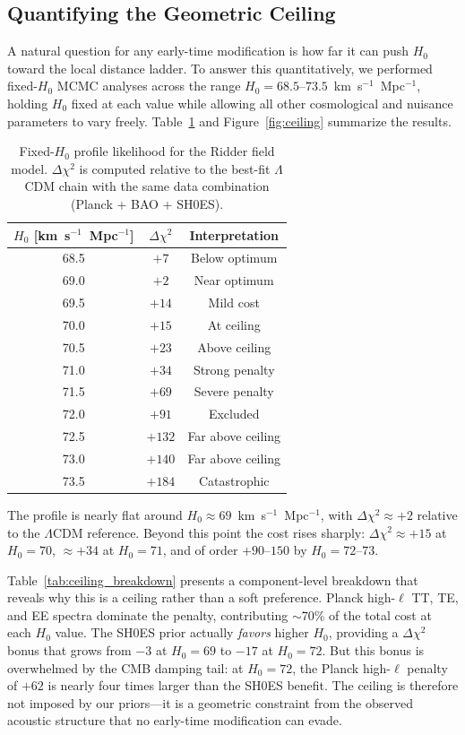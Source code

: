 \documentclass[a4paper,11pt]{article}
\begin{document}
\subsection{Quantifying the Geometric Ceiling}
\label{sec:ceiling_quantitative}

A natural question for any early-time modification is how far it can push $H_0$ toward the local distance ladder. To answer this quantitatively, we performed fixed-$H_0$ MCMC analyses across the range $H_0 = 68.5$--$73.5$~km~s$^{-1}$~Mpc$^{-1}$, holding $H_0$ fixed at each value while allowing all other cosmological and nuisance parameters to vary freely. Table~\ref{tab:h0_ceiling} and Figure~\ref{fig:ceiling} summarize the results.

\begin{table}[ht]
\centering
\caption{Fixed-$H_0$ profile likelihood for the Ridder field model. $\Delta\chi^2$ is computed relative to the best-fit $\Lambda$CDM chain with the same data combination (Planck + BAO + SH0ES).}
\label{tab:h0_ceiling}
\begin{tabular}{ccc}
\toprule
$H_0$ [km~s$^{-1}$~Mpc$^{-1}$] & $\Delta\chi^2$ & Interpretation \\
\midrule
68.5 & $+7$ & Below optimum \\
69.0 & $+2$ & Near optimum \\
69.5 & $+14$ & Mild cost \\
70.0 & $+15$ & At ceiling \\
70.5 & $+23$ & Above ceiling \\
71.0 & $+34$ & Strong penalty \\
71.5 & $+69$ & Severe penalty \\
72.0 & $+91$ & Excluded \\
72.5 & $+132$ & Far above ceiling \\
73.0 & $+140$ & Far above ceiling \\
73.5 & $+184$ & Catastrophic \\
\bottomrule
\end{tabular}
\end{table}

The profile is nearly flat around $H_0 \approx 69$~km~s$^{-1}$~Mpc$^{-1}$, with $\Delta\chi^2 \approx +2$ relative to the $\Lambda$CDM reference. Beyond this point the cost rises sharply: $\Delta\chi^2 \approx +15$ at $H_0 = 70$, $\approx +34$ at $H_0 = 71$, and of order $+90$--$150$ by $H_0 = 72$--$73$. 

Table~\ref{tab:ceiling_breakdown} presents a component-level breakdown that reveals why this is a ceiling rather than a soft preference. Planck high-$\ell$ TT, TE, and EE spectra dominate the penalty, contributing $\sim$70\% of the total cost at each $H_0$ value. The SH0ES prior actually \emph{favors} higher $H_0$, providing a $\Delta\chi^2$ bonus that grows from $-3$ at $H_0 = 69$ to $-17$ at $H_0 = 72$. But this bonus is overwhelmed by the CMB damping tail: at $H_0 = 72$, the Planck high-$\ell$ penalty of $+62$ is nearly four times larger than the SH0ES benefit. The ceiling is therefore not imposed by our priors---it is a geometric constraint from the observed acoustic structure that no early-time modification can evade.
\end{document}
